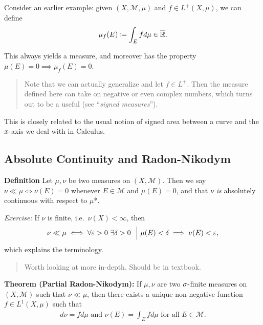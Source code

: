 Consider an earlier example: given \((X, \mathcal M, \mu)\) and
\(f\in L^+(X, \mu)\), we can define
\begin{align*}
\mu_f(E) \coloneqq \int_E f d\mu \in \overline{{\mathbb{R}}}
.\end{align*}

This always yields a measure, and moreover has the property
\(\mu(E) = 0 \implies \mu_f(E) = 0\).

\begin{quote}
Note that we can actually generalize and let \(f\in L^+\). Then the
measure defined here can take on negative or even complex numbers, which
turns out to be a useful (see ``\emph{signed measures}'').
\end{quote}

This is closely related to the usual notion of signed area between a
curve and the \(x{\hbox{-}}\)axis we deal with in Calculus.

\hypertarget{absolute-continuity-and-radon-nikodym}{%
\subsection{Absolute Continuity and
Radon-Nikodym}\label{absolute-continuity-and-radon-nikodym}}

\textbf{Definition} Let \(\mu, \nu\) be two measures on
\((X, \mathcal M)\). Then we say \(\nu \ll \mu \iff \nu(E) = 0\)
whenever \(E\in\mathcal M\) and \(\mu(E) = 0\), and that \emph{\(\nu\)
is }absolutely continuous with respect to \(\mu\)*.

\emph{Exercise:} If \(\nu\) is finite, i.e.~\(\nu(X) < \infty\), then
\begin{align*}
\nu \ll \mu \iff \forall\varepsilon >0~ \exists\delta > 0 ~ {~\mathrel{\Big|}~} \mu(E) < \delta\implies \nu(E) < \varepsilon
,\end{align*} which explains the terminology.

\begin{quote}
Worth looking at more in-depth. Should be in textbook.
\end{quote}

\textbf{Theorem (Partial Radon-Nikodym):} If \(\mu, \nu\) are two
\(\sigma{\hbox{-}}\)finite measures on \((X, \mathcal M)\) such that
\(\nu \ll \mu\), then there exists a unique non-negative function
\(f\in L^1(X, \mu)\) such that
\begin{align*}
d\nu = f d\mu
\text{ and }
\nu(E) = \int_E f d\mu \text{ for all } E\in \mathcal M
.\end{align*}

